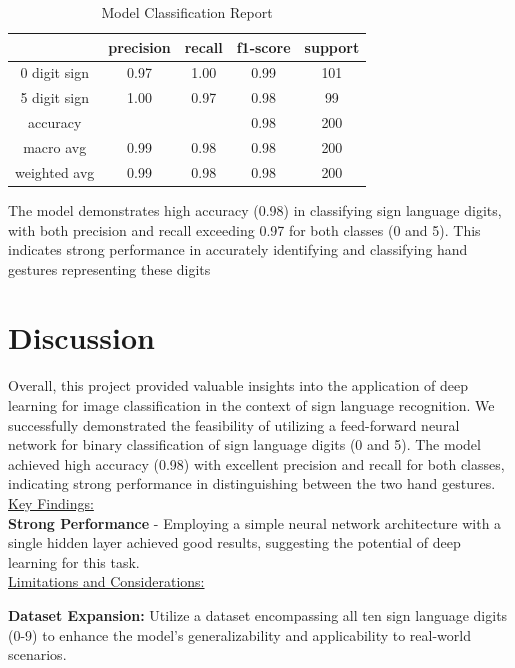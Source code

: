 \documentclass{article}
\begin{document}
\begin{table}[H]
    \centering
    \begin{tabular}{|c|c|c|c|c|}
        \hline
         & precision & recall & f1-score & support \\ \hline
        0 digit sign & 0.97 & 1.00 & 0.99 & 101 \\ \hline
        5 digit sign & 1.00 & 0.97 & 0.98 & 99  \\ \hline
        accuracy &  &  & 0.98 & 200 \\ \hline
        macro avg & 0.99 & 0.98 & 0.98 & 200 \\ \hline
        weighted avg & 0.99 & 0.98 & 0.98 & 200 \\ \hline
    \end{tabular}
    \caption{Model Classification Report}
    \label{tab:classification_report}
\end{table}

The model demonstrates high accuracy (0.98) in classifying sign language digits, with both precision and recall exceeding 0.97 for both classes (0 and 5). This indicates strong performance in accurately identifying and classifying hand gestures representing these digits

\section{Discussion}
Overall, this project provided valuable insights into the application of deep learning for image classification in the context of sign language recognition. We successfully demonstrated the feasibility of utilizing a feed-forward neural network for binary classification of sign language digits (0 and 5). The model achieved high accuracy (0.98) with excellent precision and recall for both classes, indicating strong performance in distinguishing between the two hand gestures.    \\


\underline{Key Findings:} \\
\textbf{Strong Performance} - Employing a simple neural network architecture with a single hidden layer achieved good results, suggesting the potential of deep learning for this task. \\

\underline{Limitations and Considerations:}

\textbf{Dataset Expansion:} Utilize a dataset encompassing all ten sign language digits (0-9) to enhance the model's generalizability and applicability to real-world scenarios.
\end{document}
